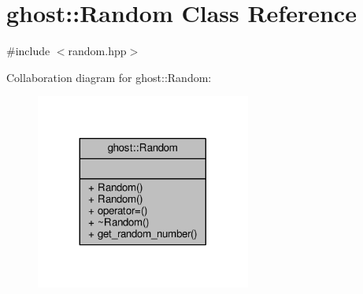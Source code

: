 \hypertarget{classghost_1_1Random}{}\section{ghost\+:\+:Random Class Reference}
\label{classghost_1_1Random}


{\ttfamily \#include $<$random.\+hpp$>$}



Collaboration diagram for ghost\+:\+:Random\+:\nopagebreak
\begin{figure}[H]
\begin{center}
\leavevmode
\includegraphics[width=200pt]{classghost_1_1Random__coll__graph}
\end{center}
\end{figure}
